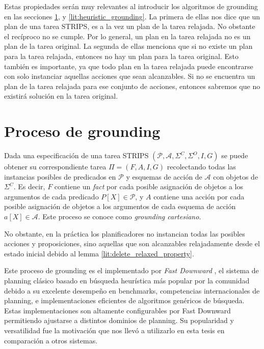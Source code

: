 Estas propiedades serán muy relevantes al introducir los algoritmos de grounding
en las secciones \ref{lit:relaxed_grounding}, y \ref{lit:heuristic_grounding}.
La primera de ellas nos dice que un plan de una tarea STRIPS, es a la vez un
plan de la tarea relajada. No obstante el recíproco no se cumple. Por lo
general, un plan en la tarea relajada no es un plan de la tarea original. La
segunda de ellas menciona que si no existe un plan para la tarea relajada,
entonces no hay un plan para la tarea original. Esto también es importante, ya
que todo plan en la tarea relajada puede encontrarse con solo instanciar
aquellas acciones que sean alcanzables. Si no se encuentra un plan de la tarea
relajada para ese conjunto de acciones, entonces sabremos que no existirá
solución en la tarea original.

\section{Proceso de grounding}
\label{lit:relaxed_grounding}

Dada una especificación de una tarea STRIPS $(\mathcal{P}, \mathcal{A},
\Sigma^{C}, \Sigma^{O}, I, G)$ se puede obtener su correspondiente tarea $\Pi =
(F, A, I, G)$ recolectando todas las instancias posibles de predicados en
$\mathcal{P}$ y esquemas de acción de $\mathcal{A}$ con objetos de $\Sigma^{C}$.
Es decir, $F$ contiene un \emph{fact} por cada posible asignación de objetos a
los argumentos de cada predicado $P[X] \in \mathcal{P}$, y $A$ contiene una
acción por cada posible asignación de objetos a los argumentos de cada esquema
de acción $a[X] \in \mathcal{A}$. Este proceso se conoce como \emph{grounding
cartesiano}.

No obstante, en la práctica los planificadores no instancian todas las posibles
acciones y proposiciones, sino aquellas que son alcanzables relajadamente desde
el estado inicial debido al lemma \ref{lit:delete_relaxed_property}.

Este proceso de grounding es el implementado por \emph{Fast Downward}
\citep{Helmert-2011}, el sistema de planning clásico basado en búsqueda
heurística más popular por la comunidad debido a su excelente desempeño en
benchmarks, competencias internacionales de planning, e implementaciones
eficientes de algoritmos genéricos de búsqueda. Estas implementaciones son
altamente configurables por Fast Downward permitiendo ajustarse a distintos
dominios de planning. Su popularidad y versatilidad fue la motivación que nos
llevó a utilizarlo en esta tesis en comparación a otros sistemas.

